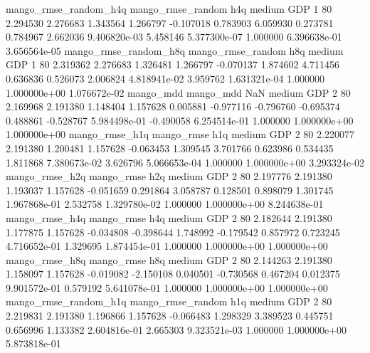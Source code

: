 mango_rmse_random_h4q mango_rmse_random                  h4q     medium      GDP                 1 80  2.294530       2.276683 1.343564       1.266797   -0.107018      0.783903      6.059930     0.273781       0.784967  2.662036 9.406820e-03     5.458146   5.377300e-07            1.000000    6.396638e-01        3.656564e-05
mango_rmse_random_h8q mango_rmse_random                  h8q     medium      GDP                 1 80  2.319362       2.276683 1.326481       1.266797   -0.070137      1.874602      4.711456     0.636836       0.526073  2.006824 4.818941e-02     3.959762   1.631321e-04            1.000000    1.000000e+00        1.076672e-02
            mango_mdd         mango_mdd                  NaN     medium      GDP                 2 80  2.169968       2.191380 1.148404       1.157628    0.005881     -0.977116     -0.796760    -0.695374       0.488861 -0.528767 5.984498e-01    -0.490058   6.254514e-01            1.000000    1.000000e+00        1.000000e+00
       mango_rmse_h1q        mango_rmse                  h1q     medium      GDP                 2 80  2.220077       2.191380 1.200481       1.157628   -0.063453      1.309545      3.701766     0.623986       0.534435  1.811868 7.380673e-02     3.626796   5.066653e-04            1.000000    1.000000e+00        3.293324e-02
       mango_rmse_h2q        mango_rmse                  h2q     medium      GDP                 2 80  2.197776       2.191380 1.193037       1.157628   -0.051659      0.291864      3.058787     0.128501       0.898079  1.301745 1.967868e-01     2.532758   1.329780e-02            1.000000    1.000000e+00        8.244638e-01
       mango_rmse_h4q        mango_rmse                  h4q     medium      GDP                 2 80  2.182644       2.191380 1.177875       1.157628   -0.034808     -0.398644      1.748992    -0.179542       0.857972  0.723245 4.716652e-01     1.329695   1.874454e-01            1.000000    1.000000e+00        1.000000e+00
       mango_rmse_h8q        mango_rmse                  h8q     medium      GDP                 2 80  2.144263       2.191380 1.158097       1.157628   -0.019082     -2.150108      0.040501    -0.730568       0.467204  0.012375 9.901572e-01     0.579192   5.641078e-01            1.000000    1.000000e+00        1.000000e+00
mango_rmse_random_h1q mango_rmse_random                  h1q     medium      GDP                 2 80  2.219831       2.191380 1.196866       1.157628   -0.066483      1.298329      3.389523     0.445751       0.656996  1.133382 2.604816e-01     2.665303   9.323521e-03            1.000000    1.000000e+00        5.873818e-01
